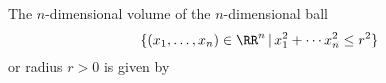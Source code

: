 

\begin{theorem}
The $n$-dimensional volume of the $n$-dimensional ball 
$$
\{ (x_1,\ldots,x_n)\in\RR^n\,|\, x_1^2+\cdots x_n^2 \leq r^2 \}
$$
or radius $r>0$ is given by 


\end{theorem}

